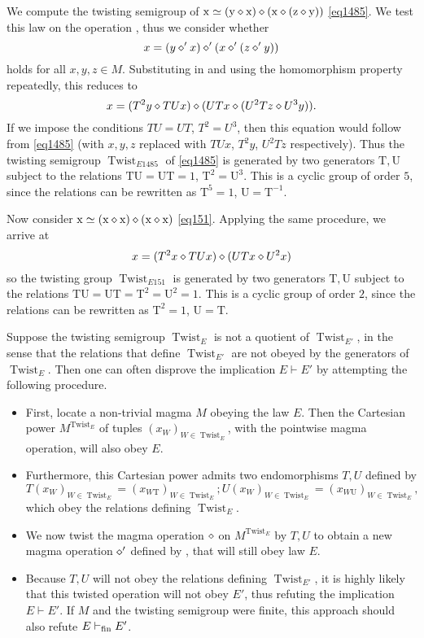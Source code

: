 \begin{example}  We compute the twisting semigroup of $\mathrm{x} \simeq (\mathrm{y} \diamond \mathrm{x}) \diamond (\mathrm{x} \diamond (\mathrm{z} \diamond \mathrm{y}))$ \eqref{eq1485}.  We test this law on the operation , thus we consider whether
$$x = (y \diamond' x) \diamond' (x \diamond' (z \diamond' y))$$
holds for all $x,y,z \in M$.  Substituting in  and using the homomorphism property repeatedly, this reduces to
$$x = (T^2y \diamond TUx) \diamond (UTx \diamond (U^2T z \diamond U^3y)).$$
If we impose the conditions $TU=UT$, $T^2 = U^3$, then this equation would follow from \eqref{eq1485} (with $x,y,z$ replaced with $TUx$, $T^2 y$, $U^2 Tz$ respectively).  Thus the twisting semigroup $\operatorname{Twist}_{E1485}$ of \eqref{eq1485} is generated by two generators $\mathrm{T}, \mathrm{U}$ subject to the relations $\mathrm{T} \mathrm{U}=\mathrm{U} \mathrm{T} = 1$, $\mathrm{T}^2 = \mathrm{U}^3$.  This is a cyclic group of order $5$, since the relations can be rewritten as $\mathrm{T}^5 = 1$, $\mathrm{U} = \mathrm{T}^{-1}$.

Now consider $\mathrm{x} \simeq (\mathrm{x} \diamond \mathrm{x}) \diamond (\mathrm{x} \diamond \mathrm{x})$ \eqref{eq151}.  Applying the same procedure, we arrive at
$$x = (T^2 x \diamond TUx) \diamond (UT x \diamond U^2 x)$$
so the twisting group $\operatorname{Twist}_{E151}$ is generated by two generators $\mathrm{T}, \mathrm{U}$ subject to the relations $\mathrm{T} \mathrm{U}=\mathrm{U} \mathrm{T} = \mathrm{T}^2 = \mathrm{U}^2 = 1$.  This is a cyclic group of order $2$, since the relations can be rewritten as $\mathrm{T}^2 = 1$, $\mathrm{U} = \mathrm{T}$.
\end{example}

Suppose the twisting semigroup $\operatorname{Twist}_E$ is not a quotient of $\operatorname{Twist}_{E'}$, in the sense that the relations that define $\operatorname{Twist}_{E'}$ are not obeyed by the generators of $\operatorname{Twist}_E$.  Then one can often disprove the implication $E \vdash E'$ by attempting the following procedure.
\begin{itemize}
\item First, locate a non-trivial magma $M$ obeying the law $E$.  Then the Cartesian power $M^{\operatorname{Twist}_E}$ of tuples $(x_W)_{W \in \operatorname{Twist}_E}$, with the pointwise magma operation, will also obey $E$.
\item Furthermore, this Cartesian power admits two endomorphisms $T, U$ defined by
$$ T (x_W)_{W \in \operatorname{Twist}_E} = (x_{W \mathrm{T}})_{W \in \operatorname{Twist}_E};
U (x_W)_{W \in \operatorname{Twist}_E} = (x_{W \mathrm{U}})_{W \in \operatorname{Twist}_E},$$
which obey the relations defining $\operatorname{Twist}_E$.
\item We now twist the magma operation $\diamond$ on $M^{\operatorname{Twist}_E}$ by $T,U$ to obtain a new magma operation $\diamond'$ defined by , that will still obey law $E$.
\item Because $T, U$ will not obey the relations defining $\operatorname{Twist}_{E'}$, it is highly likely that this twisted operation will not obey $E'$, thus refuting the implication $E \vdash E'$.  If $M$ and the twisting semigroup were finite, this approach should also refute $E \vdash_{\mathrm{fin}} E'$.
\end{itemize}

